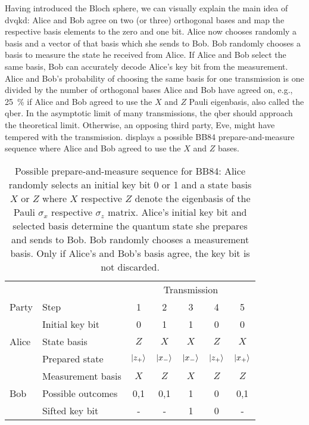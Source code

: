 Having introduced the Bloch sphere, we can visually explain the main idea of \gls{dvqkd}:
Alice and Bob agree on two (or three) orthogonal bases and map the respective basis elements to the zero and one bit.
Alice now chooses randomly a basis and a vector of that basis which she sends to Bob.
Bob randomly chooses a basis to measure the state he received from Alice.
If Alice and Bob select the same basis, Bob can accurately decode Alice's key bit from the measurement.
Alice and Bob's probability of choosing the same basis for one transmission is one divided by the number of orthogonal bases Alice and Bob have agreed on, e.g., \SI{25}{\percent} if Alice and Bob agreed to use the $X$ and $Z$ Pauli eigenbasis, also called the \gls{qber}.
In the asymptotic limit of many transmissions, the \gls{qber} should approach the theoretical limit.
Otherwise, an opposing third party, Eve, might have tempered with the transmission.
 displays a possible BB84 prepare-and-measure sequence where Alice and Bob agreed to use the $X$ and $Z$ bases.
\begin{table}[htb]
	\centering
	\begin{tabular}{llccccc}
		\toprule
		& & \multicolumn{5}{c}{Transmission} \\
		\cmidrule{3-7}
		Party & Step & 1 & 2 & 3 & 4 & 5 \\ 
		\midrule
		\multirow{3}{*}{Alice} & Initial key bit & \num{0} & \num{1} & \num{1} & \num{0} & \num{0} \\
		& State basis & $Z$ & $X$ & $X$ & $Z$ & $X$ \\
		& Prepared state & $\ket{z_+}$ & $\ket{x_-}$ & $\ket{x_-}$ & $\ket{z_+}$ & $\ket{x_+}$ \\
		\cmidrule{1-1}
		\multirow{3}{*}{Bob} & Measurement basis & $X$ & $Z$ & $X$ & $Z$ & $Z$ \\
		& Possible outcomes & \num{0},\num{1} & \num{0},\num{1} & \num{1} & \num{0} & \num{0},\num{1} \\
		& Sifted key bit & - & - & 1 & 0 & - \\
		\bottomrule
	\end{tabular}
	\caption{Possible prepare-and-measure sequence for BB84: Alice randomly selects an initial key bit \num{0} or \num{1} and a state basis $X$ or $Z$ where $X$ respective $Z$ denote the eigenbasis of the Pauli $\sigma_x$ respective $\sigma_z$ matrix. Alice's initial key bit and selected basis determine the quantum state she prepares and sends to Bob. Bob randomly chooses a measurement basis. Only if Alice's and Bob's basis agree, the key bit is not discarded.}\label{tab:dvqkd_transmission_sequence}
\end{table}
